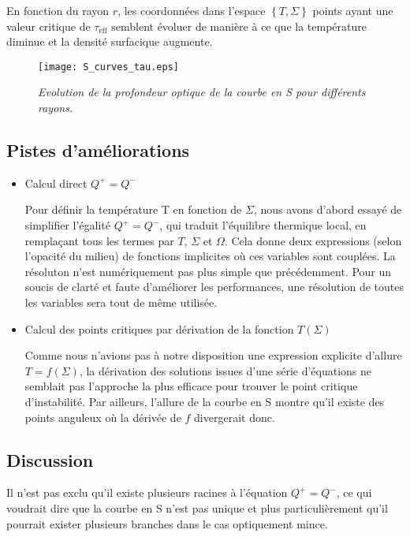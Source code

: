 En fonction du rayon $r$, les coordonnées dans l'espace $\left\lbrace T, \Sigma\right\rbrace$ points ayant une valeur critique de $\tau_\textrm{eff}$ semblent évoluer de manière à ce que la température diminue et la densité surfacique augmente.

\begin{figure}[htb!]
	\centering
	\texttt{[image: S\_curves\_tau.eps]}
	\caption{\textit{Evolution de la profondeur optique de la courbe en S pour différents rayons.}  }
	\label{Fig::bench}
\end{figure}

\subsection{Pistes d'améliorations}

\begin{itemize}

\item Calcul direct $Q^+ = Q^-$

Pour définir la température T en fonction de $\Sigma$, nous avons d'abord essayé de simplifier l'égalité $Q^+ = Q^-$, qui traduit l'équilibre thermique local, en remplaçant tous les termes par $T$, $\Sigma$ et $\Omega$. Cela donne deux expressions (selon l'opacité du milieu) de fonctions implicites où ces variables sont couplées.
La résoluton n'est numériquement pas plus simple que précédemment. Pour un soucis de clarté et faute d'améliorer les performances, une résolution de toutes les variables sera tout de même utilisée.
\item Calcul des points critiques par dérivation de la fonction $T(\Sigma)$

Comme nous n'avions pas à notre disposition une expression explicite d'allure $T = f(\Sigma)$, la dérivation des solutions issues d'une série d'équations ne semblait pas l'approche la plus efficace pour trouver le point critique d'instabilité. Par ailleurs, l'allure de la courbe en S montre qu'il existe des points anguleux où la dérivée de $f$ divergerait donc.
\end{itemize}

\subsection{Discussion}
Il n'est pas exclu qu'il existe plusieurs racines à l'équation $Q^+ = Q^-$, ce qui voudrait dire que la courbe en S n'est pas unique et plus particulièrement qu'il pourrait exister plusieurs branches dans le cas optiquement mince.


